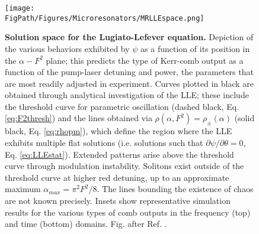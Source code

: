 \begin{figure}[htpb]
	\begin{center}
		\texttt{[image: \\FigPath/Figures/Microresonators/MRLLEspace.png]}
	\end{center}
	\caption[Solution space for the Lugiato-Lefever equation]{\textbf{Solution space for the Lugiato-Lefever equation.} Depiction of the various behaviors exhibited by $\psi$ as a function of its position in the $\alpha-F^2$ plane; this predicts the type of Kerr-comb output as a function of the pump-laser detuning and power, the parameters that are most readily adjusted in experiment. Curves plotted in black are obtained through analytical investigation of the LLE; these include the threshold curve for parametric oscillation (dashed black, Eq. \ref{eq:F2thresh}) and the lines obtained via $\rho(\alpha,F^2)=\rho_\pm(\alpha)$ (solid black, Eq. \ref{eq:rhopm}), which define the region where the LLE exhibits multiple flat solutions (i.e. solutions such that $\partial \psi/\partial \theta=0$, Eq. \ref{eq:LLEstat}). Extended patterns arise above the threshold curve through modulation instability. Solitons exist outside of the threshold curve at higher red detuning, up to an approximate maximum $\alpha_{max}=\pi^2 F^2/8$. The lines bounding the existence of chaos are not known precisely. Insets show representative simulation results for the various types of comb outputs in the frequency (top) and time (bottom) domains. \footnotesize{Fig. after Ref. }.
	 }
	
	\label{fig:MRLLEspace}
\end{figure} 



%

